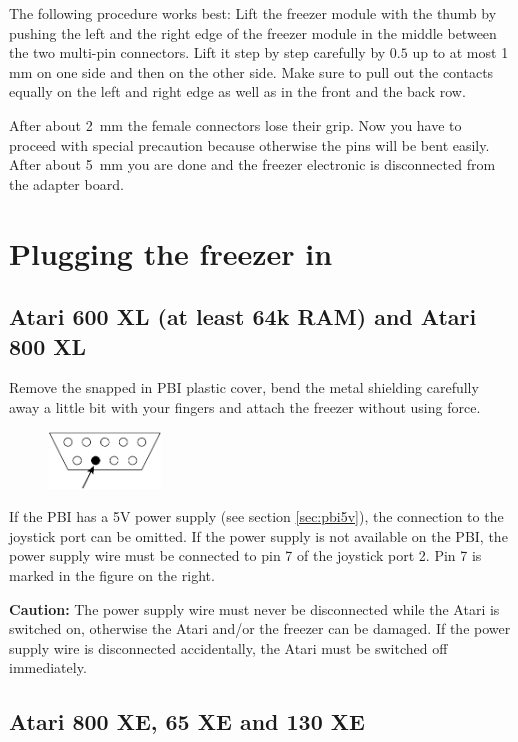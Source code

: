 The following procedure works best: Lift the freezer module with the thumb by
pushing the left and the right edge of the freezer module in the middle between the
two multi-pin connectors. Lift it step by step carefully by $0.5$ up to at most
1 mm on one side and then on the other side. Make sure to pull out the contacts
equally on the left and right edge as well as in the front and the back row.

After about 2~mm the female connectors lose their grip. Now you have to
proceed with special precaution because otherwise the pins will be bent easily.
After about 5~mm you are done and the freezer electronic is disconnected from
the adapter board.

\section{Plugging the freezer in}

\subsection{Atari 600 XL (at least 64k RAM) and Atari 800 XL}

Remove the snapped in PBI plastic cover, bend the metal shielding carefully away
a little bit with your fingers and attach the freezer without using force.

\begin{figure}
\centering\includegraphics[width=8em]{joyport.eps}
\end{figure}
If the PBI
has a 5V power supply (see section \ref{sec:pbi5v}), the connection to the
joystick port can be omitted. If the power supply is not available on the PBI,
the power supply wire must be connected to pin 7 of the joystick port 2. Pin 7
is marked in the figure on the right.\newline

\textbf{Caution:} The power supply wire must never be disconnected while the
Atari is switched on, otherwise the Atari and/or the freezer can be damaged. If
the power supply wire is disconnected accidentally, the Atari must be switched
off immediately.

\subsection{Atari 800 XE, 65 XE and 130 XE}


